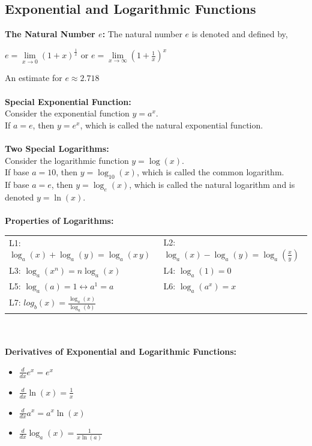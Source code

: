 \documentclass[14pt]{article}
\begin{document}
    \subsection{Exponential and Logarithmic Functions}
    \textbf{The Natural Number $e$:}
    The natural number $e$ is denoted and defined by, \\
    \begin{center}
        $e=\lim \limits_{x\rightarrow0} (1+x)^{\frac{1}{x}}$ or $e=\lim \limits_{x\rightarrow\infty}\left(1+\frac{1}{x}\right)^x$
    \end{center} 
    An estimate for $e\approx2.718$\\\\
    \textbf{Special Exponential Function:}\\
    Consider the exponential function $y=a^x$.\\
    If $a=e$, then $y=e^x$, which is called the natural exponential function.\\\\
    \textbf{Two Special Logarithms:}\\ 
    Consider the logarithmic function $y=\log(x)$.\\
    If base $a=10$, then $y=\log_10(x)$, which is called the common logarithm.\\
    If base $a=e$, then $y=\log_e(x)$, which is called the natural logarithm and is denoted $y=\ln(x)$.\\\\
    \textbf{Properties of Logarithms:}\\
    \begin{tabular}{p{5cm}p{5cm}}
        L1: $\log_a(x)+\log_a(y)=\log_a(x\,y)$ & L2:$\log_a(x)-\log_a(y)=\log_a\left(\frac{x}{y}\right)$\\
        L3: $\log_a\left(x^n\right)=n \log_a(x)$& L4: $\log_a(1)=0$\\
        L5: $\log_a (a)=1 \leftrightarrow a^1=a$& L6: $\log_a\left(a^x\right)=x$\\
        L7: $log_b(x)=\frac{\log_a(x)}{\log_a(b)}$& 
    \end{tabular}\\\\
    \textbf{Derivatives of Exponential and Logarithmic Functions:}\\
    \begin{itemize}
        \item $\frac{d}{dx} e^x=e^x$
        \item $\frac{d}{dx} \ln(x)=\frac{1}{x}$
        \item $\frac{d}{dx} a^x=a^x\ln(x)$
        \item $\frac{d}{dx} \log_a(x)=\frac{1}{x\ln(a)}$
    \end{itemize}
\end{document}
